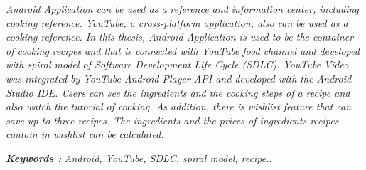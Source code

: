 \documentclass{jtetiskripsi}
\begin{document}
\begin{abstracteng}
\textit{Android Application can be used as a reference and information center, including cooking reference. YouTube, a cross-platform application, also can be used as a cooking reference. In this thesis, Android Application is used to be the container of cooking recipes and that is connected with YouTube food channel and developed with spiral model of Software Development Life Cycle (SDLC). YouTube Video was integrated by YouTube Android Player API and developed with the Android Studio IDE. Users can see the ingredients and the cooking steps  of a recipe and also watch the tutorial of cooking. As addition, there is wishlist feature that can save up to three recipes. The ingredients and the prices of ingredients recipes contain in wishlist can be calculated.}    

\bigskip
\noindent
\textbf{\emph{Keywords :}} \emph{Android, YouTube, SDLC, spiral model, recipe.}.
\end{abstracteng}
\begin{counterpage}
\end{counterpage}









\end{document}
